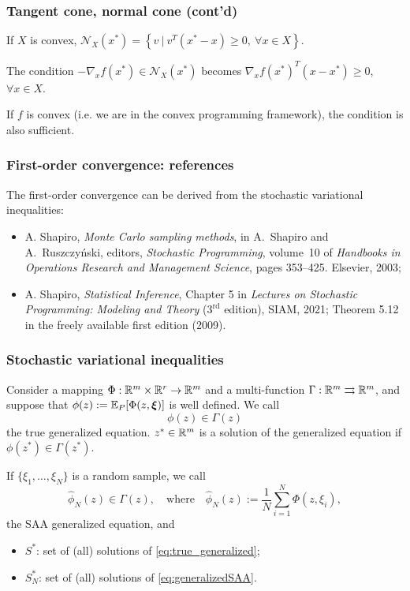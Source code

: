 \documentclass[aspectratio=169]{beamer}
\begin{document}
\begin{frame}
\frametitle{Tangent cone, normal cone (cont'd)}

If $X$ is convex,
$
\mathcal{N}_{X}(x^*) = \left\lbrace v\ |\ v^T(x^*-x) \geq 0,\ \forall x \in X \right\rbrace.
$

\mbox{}

The condition $-\nabla_x f(x^*) \in \mathcal{N}_{X}(x^*)$ becomes
$\nabla_x f(x^*)^T (x-x^*) \geq 0$, $\forall x \in X$.

\mbox{}

If $f$ is convex (i.e. we are in the convex programming framework), the condition is also sufficient.

\end{frame}

\begin{frame}
\frametitle{First-order convergence: references}

The {\blue first-order convergence} can be derived from the stochastic variational inequalities:
\begin{itemize}
	\item 
A. Shapiro, {\sl Monte Carlo sampling methods},
in A.~Shapiro and A.~Ruszczy\'nski, editors, {\sl Stochastic Programming}, volume~10 of {\sl Handbooks in Operations Research and Management Science}, pages 353--425. Elsevier, 2003;
\item
A. Shapiro, {\sl Statistical Inference}, Chapter 5 in {\sl Lectures on Stochastic Programming: Modeling and Theory} ($3^{\text{rd}}$ edition), SIAM, 2021; Theorem 5.12 in the freely available first edition (2009).
\end{itemize}

\end{frame}

\begin{frame}
\frametitle{Stochastic variational inequalities}

Consider a mapping $\Phi: \mathbb{R}^m \times \mathbb{R}^r \rightarrow \mathbb{R}^m$ and a multi-function $\Gamma: \mathbb{R}^m \rightrightarrows  \mathbb{R}^m$, and suppose that $\phi(z) := {\mathbb{E}}_{P}[\Phi(z, {\boldsymbol{\xi}})]$ is well defined.
We call
\begin{equation}
\phi(z) \in \Gamma(z)
\label{eq:true_generalized}
\end{equation}
the true {\blue generalized equation}.
$z^* \in \mathbb{R}^m$ is a solution of the generalized equation if $\phi(z^*) \in \Gamma(z^*)$.

\mbox{}

If $\lbrace \xi_1,\ldots,\xi_N \rbrace$ is a random sample, we call
\begin{equation}
\hat{\phi}_N(z) \in \Gamma(z), \quad \text{where} \quad \hat{\phi}_N(z) := \frac{1}{N} \sum_{i = 1}^N \Phi(z,\xi_i),
\label{eq:generalizedSAA}
\end{equation}
the SAA generalized equation, and
\begin{itemize}
	\item $S^*$: set of (all) solutions of \eqref{eq:true_generalized};
	\item $S^*_N$: set of (all) solutions of \eqref{eq:generalizedSAA}.
\end{itemize}

\end{frame}
\end{document}
